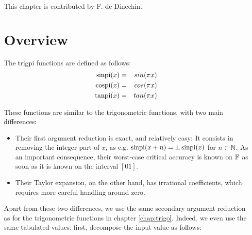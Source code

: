 %
%
%
%


This chapter is contributed by F. de Dinechin.


\section{Overview}
The trigpi functions are defined as follows:
\begin{eqnarray}
 \operatorname{sinpi}(x) &=& sin(\pi x) \\
 \operatorname{cospi}(x) &=& cos(\pi x) \\
 \operatorname{tanpi}(x) &=& tan(\pi x)  
\end{eqnarray}

These functions are similar to the trigonometric functions, with
two main differences:
\begin{itemize}
\item Their first argument reduction is exact, and relatively easy: It
  consists in removing the integer part of $x$, as e.g.
  $\operatorname{sinpi}(x+n)=\pm \operatorname{sinpi}(x)$ for $n\in\mathbb {N}$. As an important consequence, their
  worst-case critical accuracy is known on $\mathbb {F}$ as soon as it is known
  on  the interval $[0 1]$.
\item Their Taylor expansion, on the other hand, has irrational
  coefficients, which requires more careful handling around zero.
\end{itemize}

Apart from these two differences, we use the same secondary argument
reduction as for the trigonometric functions in chapter
\ref{chap:trigo}. Indeed, we even use the same tabulated values:
first, decompose the input value as follows: 

